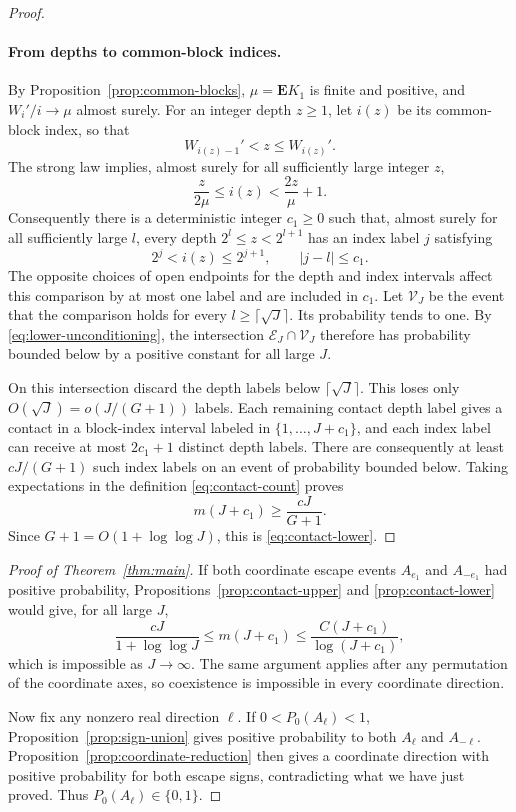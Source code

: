 \begin{proof}
\paragraph{From depths to common-block indices.}
By Proposition~\ref{prop:common-blocks}, $\mu=\mathbf E K_1$ is finite and positive,
and $W_i'/i\to\mu$ almost surely.  For an integer depth $z\ge1$, let $i(z)$ be
its common-block index, so that
\[
 W_{i(z)-1}'<z\le W_{i(z)}'.
\]
The strong law implies, almost surely for all sufficiently large integer $z$,
\begin{equation}\label{eq:depth-index-comparison}
 \frac{z}{2\mu}\le i(z)<\frac{2z}{\mu}+1.
\end{equation}
Consequently there is a deterministic integer $c_1\ge0$ such that, almost
surely for all sufficiently large $l$, every depth $2^l\le z<2^{l+1}$ has
an index label $j$ satisfying
\[
 2^j<i(z)\le2^{j+1},\qquad |j-l|\le c_1.
\]
The opposite choices of open endpoints for the depth and index intervals
affect this comparison by at most one label and are included in $c_1$.
Let $\mathcal V_J$ be the event that the comparison holds for every
$l\ge\lceil\sqrt J\rceil$.  Its probability tends to one.  By
\eqref{eq:lower-unconditioning}, the intersection $\mathcal E_J\cap\mathcal V_J$
therefore has probability bounded below by a positive constant for all large
$J$.

On this intersection discard the depth labels below $\lceil\sqrt J\rceil$.
This loses only $O(\sqrt J)=o(J/(G+1))$ labels.  Each remaining contact depth
label gives a contact in a block-index interval labeled in
$\{1,\ldots,J+c_1\}$, and each index label can receive at most $2c_1+1$
distinct depth labels.  There are consequently at least $cJ/(G+1)$ such
index labels on an event of probability bounded below.  Taking expectations
in the definition \eqref{eq:contact-count} proves
\[
 m(J+c_1)\ge\frac{cJ}{G+1}.
\]
Since $G+1=O(1+\log\log J)$, this is \eqref{eq:contact-lower}.
\end{proof}

\begin{proof}[Proof of Theorem~\ref{thm:main}]
If both coordinate escape events $A_{e_1}$ and $A_{-e_1}$ had positive
probability, Propositions~\ref{prop:contact-upper} and
\ref{prop:contact-lower} would give, for all large $J$,
\[
 \frac{cJ}{1+\log\log J}
 \le m(J+c_1)
 \le \frac{C(J+c_1)}{\log(J+c_1)},
\]
which is impossible as $J\to\infty$.  The same argument applies after any
permutation of the coordinate axes, so coexistence is impossible in every
coordinate direction.

Now fix any nonzero real direction $\ell$.  If $0<P_0(A_\ell)<1$,
Proposition~\ref{prop:sign-union} gives positive probability to both
$A_\ell$ and $A_{-\ell}$.  Proposition~\ref{prop:coordinate-reduction} then
gives a coordinate direction with positive probability for both escape
signs, contradicting what we have just proved.  Thus $P_0(A_\ell)\in\{0,1\}$.
\end{proof}
